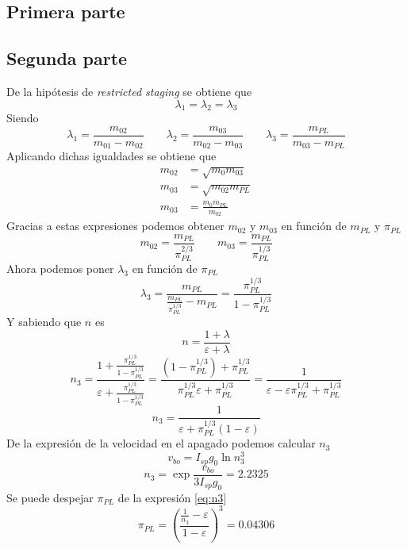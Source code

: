 \documentclass{article}
\begin{document}
\subsection{Primera parte}

\subsection{Segunda parte}
De la hipótesis de \textit{restricted staging} se obtiene que
 $$ \lambda_{1}=\lambda_{2}=\lambda_{3} $$
Siendo
\[ \lambda_{1}=\frac{m_{02}}{m_{01}-m_{02}} \qquad \lambda_{2}=\frac{m_{03}}{m_{02}-m_{03}} \qquad \lambda_{3}=\frac{m_{PL}}{m_{03}-m_{PL}} \]
Aplicando dichas igualdades se obtiene que
\begin{align*}
    m_{02} & = \sqrt{m_{0}m_{03}}  \\
    m_{03} & =\sqrt{m_{02}m_{PL}} \\
    m_{03} & = \frac{m_{0}m_{PL}}{m_{02}}  
\end{align*}
Gracias a estas expresiones podemos obtener  $m_{02}$ y $m_{03}$ en función de $m_{PL}$ y $\pi_{PL}$
\begin{equation}\label{eq:mass}
    m_{02}=\frac{m_{PL}}{\pi_{PL}^{2/3}} \qquad
    m_{03}=\frac{m_{PL}}{\pi_{PL}^{1/3}}
\end{equation}
Ahora podemos poner $\lambda_{3}$ en función de $\pi_{PL}$
\begin{equation}
    \lambda_{3}=\frac{m_{PL}}{\frac{m_{PL}}{\pi_{PL}^{1/3}}-m_{PL}}=\frac{\pi_{PL}^{1/3}}{1-\pi_{PL}^{1/3}}
\end{equation}
Y sabiendo que $n$ es
$$ n=\frac{1+\lambda}{\varepsilon+\lambda} $$
$$ n_{3}=\frac{1+\frac{\pi_{PL}^{1/3}}{1-\pi_{PL}^{1/3}}}{\varepsilon+\frac{\pi_{PL}^{1/3}}{1-\pi_{PL}^{1/3}}}
=\frac{(1-\pi_{PL}^{1/3})+\pi_{PL}^{1/3}}{\pi_{PL}^{1/3}\varepsilon+\pi_{PL}^{1/3}}
=\frac{1}{\varepsilon-\varepsilon\pi_{PL}^{1/3}+\pi_{PL}^{1/3}}$$
\begin{equation}\label{eq:n3}
    n_{3}=\frac{1}{\varepsilon+\pi_{PL}^{1/3}(1-\varepsilon)}
\end{equation}
De la expresión de la velocidad en el apagado podemos calcular $n_{3}$
\begin{equation}
    v_{bo}=I_{sp}g_{0}\ln{n_{3}^3}
\end{equation}
\begin{equation}
    n_{3}=\exp{\frac{v_{bo}}{3I_{sp}g_{0}}} = \num{2.2325}
\end{equation}
Se puede despejar $\pi_{PL}$ de la expresión \ref{eq:n3}
\begin{equation}
    \pi_{PL}=\left(\frac{\frac{1}{n_{3}}-\varepsilon}{1-\varepsilon}\right)^3 = \num{0.04306}
\end{equation}
\end{document}
